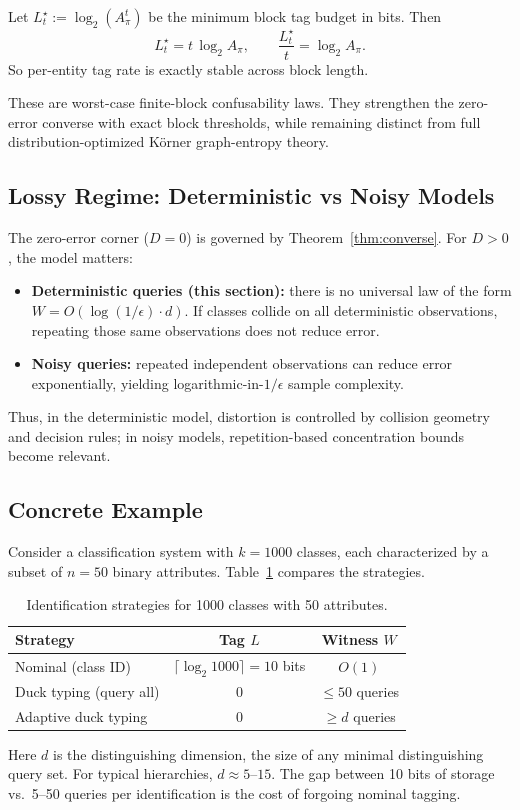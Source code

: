 \begin{corollary}
\label{cor:graph-logbit-scaling}
Let $L_t^\star := \log_2(A_\pi^t)$ be the minimum block tag budget in bits. Then
\[
L_t^\star = t\,\log_2 A_\pi,
\qquad
\frac{L_t^\star}{t} = \log_2 A_\pi.
\]
So per-entity tag rate is exactly stable across block length.
\end{corollary}

\begin{remark}[Scope]
These are worst-case finite-block confusability laws. They strengthen the zero-error converse with exact block thresholds, while remaining distinct from full distribution-optimized K\"orner graph-entropy theory.
\end{remark}

\subsection{Lossy Regime: Deterministic vs Noisy Models}

The zero-error corner ($D=0$) is governed by Theorem~\ref{thm:converse}. For $D>0$, the model matters:
\begin{itemize}
\item \textbf{Deterministic queries (this section):} there is no universal law of the form $W=O(\log(1/\epsilon)\cdot d)$. If classes collide on all deterministic observations, repeating those same observations does not reduce error.
\item \textbf{Noisy queries:} repeated independent observations can reduce error exponentially, yielding logarithmic-in-$1/\epsilon$ sample complexity.
\end{itemize}

Thus, in the deterministic model, distortion is controlled by collision geometry and decision rules; in noisy models, repetition-based concentration bounds become relevant.

\subsection{Concrete Example}

Consider a classification system with $k = 1000$ classes, each characterized by a subset of $n = 50$ binary attributes. Table~\ref{tab:strategies} compares the strategies.

\begin{table}[t]
\centering
\caption{Identification strategies for 1000 classes with 50 attributes.}
\label{tab:strategies}
\begin{tabular}{lcc}
\toprule
\textbf{Strategy} & \textbf{Tag $L$} & \textbf{Witness $W$} \\
\midrule
Nominal (class ID) & $\lceil \log_2 1000 \rceil = 10$ bits & $O(1)$ \\
Duck typing (query all) & $0$ & $\leq 50$ queries \\
Adaptive duck typing & $0$ & $\geq d$ queries \\
\bottomrule
\end{tabular}
\end{table}

Here $d$ is the distinguishing dimension, the size of any minimal distinguishing query set. For typical hierarchies, $d \approx 5$--$15$. The gap between 10 bits of storage vs.\ 5--50 queries per identification is the cost of forgoing nominal tagging.
